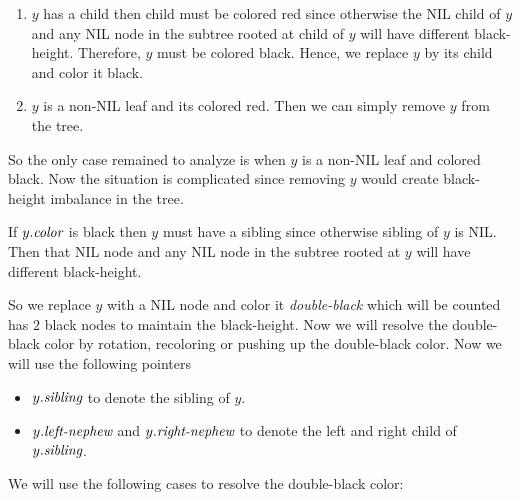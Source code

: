 \begin{enumerate}
	\item $y$ has a child then child must be colored red since otherwise the NIL child of $y$ and any NIL node in the subtree rooted at child of $y$ will have different black-height. Therefore, $y$ must be colored black. Hence, we replace $y$ by its child and color it black.
	\item $y$ is a non-NIL leaf and its colored red. Then we can simply remove $y$ from the tree.
\end{enumerate}
So the only case remained to analyze is when $y$ is a non-NIL leaf and colored black. Now the situation is complicated since removing $y$ would create black-height imbalance in the tree.
\begin{observation}
	If $y.\emph{color}$ is black then $y$ must have a sibling since otherwise sibling of $y$ is NIL. Then that NIL node and any NIL node in the subtree rooted at $y$ will have different black-height.
\end{observation}
So we replace $y$ with a NIL node and color it \emph{double-black} which  will be counted has $2$ black nodes to maintain the black-height. Now we will resolve the double-black color by rotation, recoloring or pushing up the double-black color. Now we will use the following pointers \begin{itemize}
	\item $y.\emph{sibling}$ to denote the sibling of $y$.
	\item $y.\emph{left-nephew}$ and  $y.\emph{right-nephew}$ to denote the left and right child of $y.\emph{sibling}$.
\end{itemize} We will use the following cases to resolve the double-black color:
